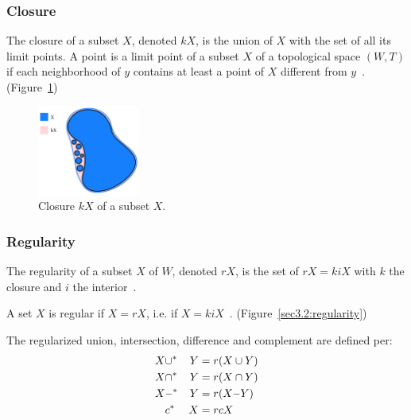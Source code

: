 \documentclass[a4paper,11pt,oneside]{article}
\newcommand{\minus}{\scalebox{0.9}[1.0]{$-$}} %
\begin{document}
\subsubsection{Closure}
    
\begin{definition}
	The closure of a subset $X$, denoted $kX$, is the union of $X$ with the set of all its limit points. A point is a limit point of a subset $X$ of a topological space $(W, T)$ if each neighborhood of $y$ contains at least a point of $X$ different from $y$~\cite{Requicha1978MathematicalFO}. (Figure~\ref{sec3.2:closure})
\end{definition}
    
\begin{figure}[ht]
	\begin{center}
		\includegraphics[width=0.3\textwidth]{section3/3.2/closure.png}
	\end{center}
	\caption{Closure $kX$ of a subset $X$.}
	\label{sec3.2:closure}
\end{figure}
    
\subsubsection{Regularity}
    
\begin{definition}[Regularity]
	The regularity of a subset $X$ of $W$, denoted $rX$, is the set of $rX = kiX$ with $k$ the closure and $i$ the interior~\cite{mansfield_1987}.
\end{definition}
\begin{definition}
	A set $X$ is regular if $X = rX$, i.e. if $X = kiX$~\cite{mansfield_1987}. (Figure~\ref{sec3.2:regularity}) 
\end{definition}
    
\begin{definition}
	The regularized union, intersection, difference and complement are defined per:
	\begin{alignat*}{3}
		X & \cup^* & Y  & = r(X \cup Y)   \\
		X  & \cap^* & Y  & = r(X \cap Y)   \\
		X & \minus^* & Y & = r(X \minus Y) \\
		&c{^*}&X      & = rcX           
	\end{alignat*}
\end{definition}
    
\end{document}
